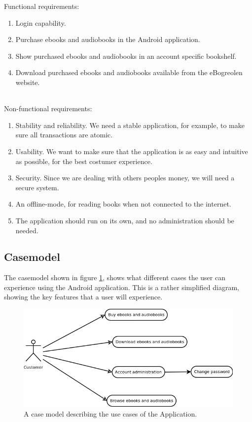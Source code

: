 \message{ !name(Rapport.tex)}\documentclass[12pt]{article}
\begin{document}
Functional requirements:
\begin{enumerate}
\item Login capability.
\item Purchase ebooks and audiobooks in the Android application.
\item Show purchased ebooks and audiobooks in an account specific bookshelf.
\item Download purchased ebooks and audiobooks available from the eBogreolen website.
\end{enumerate}
$ $\\
Non-functional requirements:
\begin{enumerate}
\item Stability and reliability. We need a stable application, for example, to make sure all transactions are atomic.
\item Usability. We want to make sure that the application is as easy and intuitive as possible, for the best costumer experience.
\item Security. Since we are dealing with others peoples money, we will need a secure system.
\item An offline-mode, for reading books when not connected to the internet.
\item The application should run on its own, and no administration should be needed.
\end{enumerate}

\subsection{Casemodel}

The casemodel shown in figure \ref{casemodel}, shows what different cases the user can experience using the Android application. This is a rather simplified diagram, showing the key features that a user will experience.
\begin{figure}[H]
\center
\includegraphics[scale=0.7]{Casemodel.png}
\caption{A case model describing the use cases of the Application.}
\label{casemodel}
\end{figure}
\end{document}
